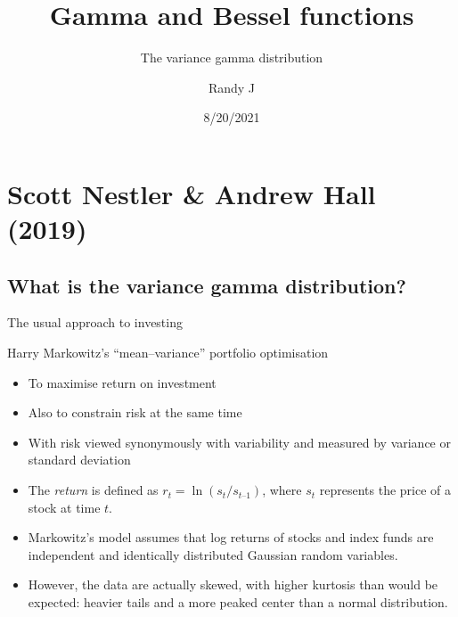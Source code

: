 \documentclass[
  ignorenonframetext,
]{beamer}
\title{Gamma and Bessel functions}
\subtitle{The variance gamma distribution}
\author{Randy J}
\date{8/20/2021}
\begin{document}
\frame{\titlepage}

\begin{frame}[allowframebreaks]
  \tableofcontents[hideallsubsections]
\end{frame}
\hypertarget{scott-nestler-andrew-hall-2019}{%
\section{Scott Nestler \& Andrew Hall
(2019)}\label{scott-nestler-andrew-hall-2019}}

\hypertarget{what-is-the-variance-gamma-distribution}{%
\subsection{What is the variance gamma
distribution?}\label{what-is-the-variance-gamma-distribution}}

\begin{frame}{The usual approach to investing}
\protect\hypertarget{the-usual-approach-to-investing}{}
\begin{block}{Harry Markowitz's ``mean--variance'' portfolio
optimisation}
\protect\hypertarget{harry-markowitzs-meanvariance-portfolio-optimisation}{}
\begin{itemize}
\item
  To maximise return on investment
\item
  Also to constrain risk at the same time
\item
  With risk viewed synonymously with variability and measured by
  variance or standard deviation
\item
  The \emph{return} is defined as \(r_t = \ln(s_t / s_{t–1})\), where
  \(s_t\) represents the price of a stock at time \(t\).
\item
  Markowitz's model assumes that log returns of stocks and index funds
  are independent and identically distributed Gaussian random variables.
\item
  However, the data are actually skewed, with higher kurtosis than would
  be expected: heavier tails and a more peaked center than a normal
  distribution.
\end{itemize}
\end{block}
\end{frame}
\end{document}
